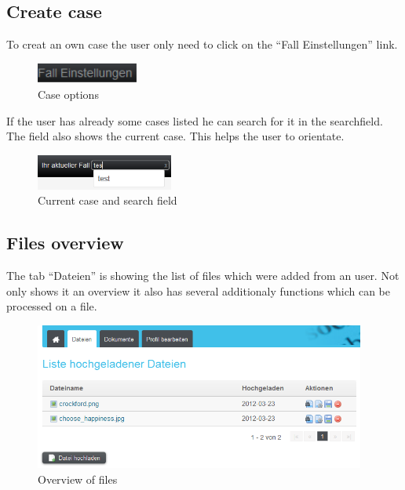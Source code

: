 \subsection{Create case}

To creat an own case the user only need to click on the \enquote{Fall Einstellungen} link.

\begin{figure}[!h]
  \centering
    \includegraphics[width=0.30\textwidth]{images/basic_functionalities/case_options.png}
  \caption{Case options}
  \label{fig:case options}
\end{figure}


If the user has already some cases listed he can search for it in the searchfield. The field also shows the current case. This helps the user to orientate.
\begin{figure}[!h]
  \centering
    \includegraphics[width=0.40\textwidth]{images/basic_functionalities/current_case_search_field.png}
  \caption{Current case and search field}
  \label{fig:current case and search field}
\end{figure}

\subsection{Files overview}

The tab \enquote{Dateien} is showing the list of files which were added from an user. Not only shows it an overview it 
also has several additionaly functions which can be processed on a file.

\begin{figure}[!h]
  \centering
    \includegraphics[width=0.97\textwidth]{images/basic_functionalities/dateien.png}
  \caption{Overview of files}
  \label{fig:overview of files}
\end{figure}

